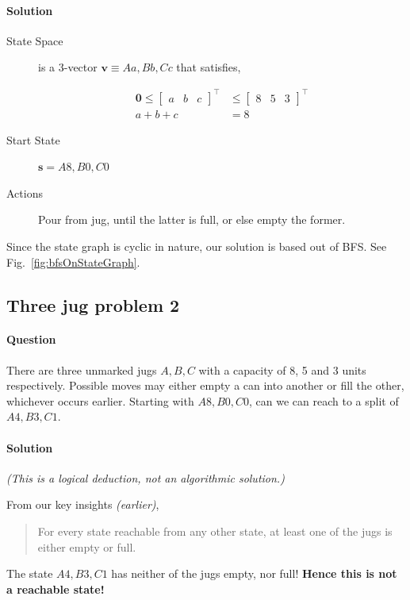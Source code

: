 \documentclass[11pt]{article}
\begin{document}
\paragraph*{Solution}
\label{sec:orgeb7dfcc}

\begin{description}
\item[{State Space}] is a 3-vector \(\mathbf{v} \equiv
  Aa,Bb,Cc\) that satisfies,

\begin{align*}
\boldsymbol{0}
  \leqslant \begin{bmatrix}a&b&c \end{bmatrix}^{\top}
  & \leqslant \begin{bmatrix}8&5&3 \end{bmatrix}^{\top}
  \\
  a+b+c &= 8
\end{align*}

\item[{Start State}] \(\mathbf{s}=A8,B0,C0\)

\item[{Actions}] Pour from jug, until the latter is full,
or else empty the former.
\end{description}

Since the state graph is cyclic in nature, our solution
is based out of BFS. See 
Fig.~\ref{fig:bfsOnStateGraph}.

\subsection{Three jug problem 2}
\label{sec:orgdbf07a5}
\paragraph*{Question}
\label{sec:org0327c2b}
There are three unmarked jugs \(A,B,C\) with a capacity
of 8, 5 and 3 units respectively.  Possible moves may
either empty a can into another or fill the other,
whichever occurs earlier.  Starting with \(A8,B0,C0\),
can we can reach to a split of \(A4,B3,C1\).

\paragraph*{Solution}
\label{sec:org5a0e26a}

\emph{(This is a logical deduction, not an algorithmic
solution.)}

From our key insights \emph{(earlier)},

\begin{quote}
For every state reachable from any other state, at
least one of the jugs is either empty or full.
\end{quote}

The state \(A4,B3,C1\) has neither of the jugs empty, nor
full!  \textbf{Hence this is not a reachable state!}
\end{document}
